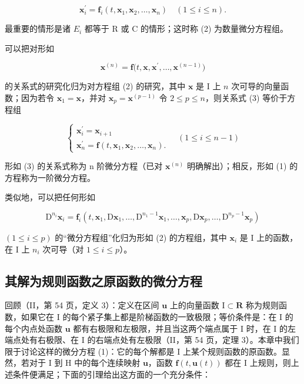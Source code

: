 \[
\mathbf {x} _ {i} ^ {\prime} = \mathbf {f} _ {i} (t, \mathbf {x} _ {1}, \mathbf {x} _ {2}, \dots , \mathbf {x} _ {n}) \quad (1 \leqslant i \leqslant n).\tag{2}
\]

最重要的情形是诸 \(E_{i}\) 都等于 R 或 C 的情形；这时称 (2) 为数量微分方程组。

可以把对形如

\[
\mathbf {x} ^ {(n)} = \mathbf {f} \big (t, \mathbf {x}, \mathbf {x} ^ {\prime}, \dots , \mathbf {x} ^ {(n - 1)} \big)\tag{3}
\]

的关系式的研究化归为对方程组 (2) 的研究，其中 \(\mathbf{x}\) 是 I 上 \(n\) 次可导的向量函数；因为若令 \(\mathbf{x}_1 = \mathbf{x}\)，并对 \(\mathbf{x}_p = \mathbf{x}^{(p - 1)}\) 令 \(2 \leqslant p \leqslant n\)，则关系式 (3) 等价于方程组

\[
\left\{ \begin{array}{l} \mathbf {x} _ {i} ^ {\prime} = \mathbf {x} _ {i + 1} \\ \mathbf {x} _ {n} ^ {\prime} = \mathbf {f} (t, \mathbf {x} _ {1}, \mathbf {x} _ {2}, \ldots , \mathbf {x} _ {n}). \end{array} \right. \quad (1 \leqslant i \leqslant n - 1)\tag{4}
\]

形如 (3) 的关系式称为 n 阶微分方程（已对 \(\mathbf{x}^{(n)}\) 明确解出）；相反，形如 (1) 的方程称为一阶微分方程。

类似地，可以把任何形如

\[
\mathrm{D} ^ {n _ {i}} \mathbf {x} _ {i} = \mathbf {f} _ {i} (t, \mathbf {x} _ {1}, \mathrm{D} \mathbf {x} _ {1}, \dots , \mathrm{D} ^ {n _ {1} - 1} \mathbf {x} _ {1}, \dots , \mathbf {x} _ {p}, \mathrm{D} \mathbf {x} _ {p}, \dots , \mathrm{D} ^ {n _ {p} - 1} \mathbf {x} _ {p})\tag{5}
\]

\((1 \leqslant i \leqslant p)\) 的“微分方程组”化归为形如 (2) 的方程组，其中 \(\mathbf{x}_i\) 是 I 上的函数，在 I 上 \(n_i\) 次可导（对 \(1 \leqslant i \leqslant p\)）。

\subsection{其解为规则函数之原函数的微分方程}

回顾（II，第 54 页，定义 3）：定义在区间 \(\mathbf{u}\) 上的向量函数 \(\mathrm{I} \subset \mathbf{R}\) 称为规则函数，如果它在 I 的每个紧子集上都是阶梯函数的一致极限；等价条件是：在 I 的每个内点处函数 \(\mathbf{u}\) 都有右极限和左极限，并且当这两个端点属于 I 时，在 I 的左端点处有右极限、在 I 的右端点处有左极限（II，第 54 页，定理 3）。本章中我们限于讨论这样的微分方程 (1)：它的每个解都是 I 上某个规则函数的原函数。显然，若对于 I 到 H 中的每个连续映射 \(\mathbf{u}\)，函数 \(\mathbf{f}(t, \mathbf{u}(t))\) 都在 I 上规则，则上述条件便满足；下面的引理给出这方面的一个充分条件：

